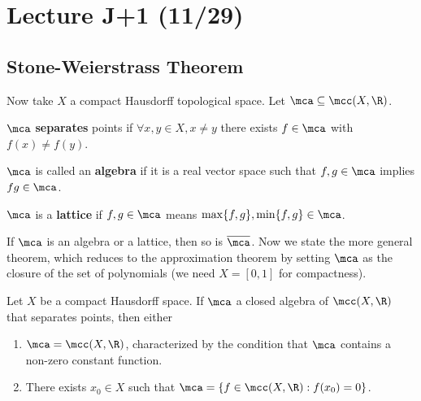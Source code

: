 \section{Lecture J+1 (11/29)}
\subsection{Stone-Weierstrass Theorem}

Now take $X$ a compact Hausdorff topological space.
Let $\mca \subseteq \mcc(X, \R)$.

\begin{definition}
$\mca$
\textbf{separates} points if $\forall x, y \in X, x \neq y$ there exists $f \in \mca$
with $f(x) \neq f(y)$. 

\begin{definition}
$\mca$ is called an \textbf{algebra}
if it is a real vector space
such that $f, g \in \mca$ implies $fg \in \mca$.
\end{definition}

\begin{definition}
    $\mca$ is a \textbf{lattice} if $f, g \in \mca$ means $\max\{f, g\}, \min\{f, g\} \in \mca$.
\end{definition}
If $\mca$ is an algebra or a lattice, then so is $\overline{\mca}$.
Now we state the more general theorem, which reduces to the
approximation theorem by setting $\mca$ as the closure of the set of polynomials
(we need $X = [0, 1]$ for compactness).
\begin{theorem}
    Let $X$ be a compact Hausdorff space. If $\mca$ a closed algebra of $\mcc(X, \R)$
    that separates points, then either
    \begin{enumerate}
        \item $\mca = \mcc(X, \R)$, characterized by the condition that $\mca$ contains a
        non-zero constant function.
        \item There exists $x_0 \in X$ such that $\mca = \{ f \in \mcc(X, \R) : f(x_0) = 0\}$.
    \end{enumerate}
\end{theorem}


\end{definition}
